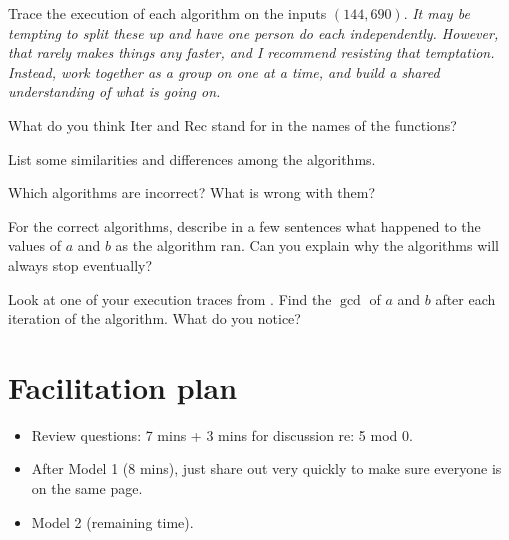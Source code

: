 \documentclass{tufte-handout}
\begin{document}
\begin{questions}
\item \label{q:trace} Trace the execution of each algorithm on the
  inputs $(144,690)$. \emph{It may be tempting to split these up and
    have one person do each independently.  However, that rarely makes
    things any faster, and I recommend resisting that temptation.
    Instead, work together as a group on one at a time, and build a
    shared understanding of what is going on.}
\end{questions}

\newpage
\begin{questions}
\item What do you think \textsf{Iter} and \textsf{Rec} stand for in
  the names of the functions?
\item List some similarities and differences among the algorithms.
\item Which algorithms are incorrect?  What is wrong with them?
\item For the correct algorithms, describe in a few sentences what
  happened to the values of $a$ and $b$ as the algorithm ran.  Can you
  explain why the algorithms will always stop eventually?
\item Look at one of your execution traces from .  Find
  the $\gcd$ of $a$ and $b$ after each iteration of the algorithm.
  What do you notice?
\end{questions}

\newpage

\section{Facilitation plan}
\label{sec:facilitation}

\begin{itemize}
\item Review questions: 7 mins + 3 mins for discussion re: 5 mod 0.

\item After Model 1 (8 mins), just share out very quickly to make sure
  everyone is on the same page.

\item Model 2 (remaining time).

\end{itemize}
\end{document}
